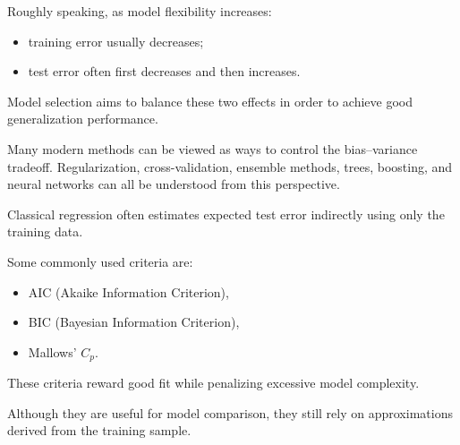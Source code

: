 \documentclass[
  letterpaper,
  DIV=11,
  numbers=noendperiod]{scrreprt}
\providecommand{\tightlist}{%
  \setlength{\itemsep}{0pt}\setlength{\parskip}{0pt}}
\theoremstyle{definition}
\theoremstyle{definition}
\theoremstyle{plain}
\theoremstyle{plain}
\theoremstyle{remark}
\begin{document}
Roughly speaking, as model flexibility increases:

\begin{itemize}
\tightlist
\item
  training error usually decreases;
\item
  test error often first decreases and then increases.
\end{itemize}

Model selection aims to balance these two effects in order to achieve
good generalization performance.

\begin{tcolorbox}[enhanced jigsaw, arc=.35mm, bottomrule=.15mm, bottomtitle=1mm, breakable, colback=white, colbacktitle=quarto-callout-note-color!10!white, colframe=quarto-callout-note-color-frame, coltitle=black, left=2mm, leftrule=.75mm, opacityback=0, opacitybacktitle=0.6, rightrule=.15mm, title=\textcolor{quarto-callout-note-color}{\faInfo}\hspace{0.5em}{Main Point}, titlerule=0mm, toprule=.15mm, toptitle=1mm]

Many modern methods can be viewed as ways to control the bias--variance
tradeoff. Regularization, cross-validation, ensemble methods, trees,
boosting, and neural networks can all be understood from this
perspective.

\end{tcolorbox}

\begin{tcolorbox}[enhanced jigsaw, arc=.35mm, bottomrule=.15mm, bottomtitle=1mm, breakable, colback=white, colbacktitle=quarto-callout-note-color!10!white, colframe=quarto-callout-note-color-frame, coltitle=black, left=2mm, leftrule=.75mm, opacityback=0, opacitybacktitle=0.6, rightrule=.15mm, title=\textcolor{quarto-callout-note-color}{\faInfo}\hspace{0.5em}{Information Criteria and Estimated Test Error}, titlerule=0mm, toprule=.15mm, toptitle=1mm]

Classical regression often estimates expected test error indirectly
using only the training data.

Some commonly used criteria are:

\begin{itemize}
\tightlist
\item
  AIC (Akaike Information Criterion),
\item
  BIC (Bayesian Information Criterion),
\item
  Mallows' \(C_p\).
\end{itemize}

These criteria reward good fit while penalizing excessive model
complexity.

Although they are useful for model comparison, they still rely on
approximations derived from the training sample.

\end{tcolorbox}
\end{document}
